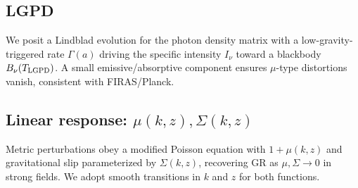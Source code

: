 
\subsection{LGPD}
We posit a Lindblad evolution for the photon density matrix with a low-gravity-triggered rate $\Gamma(a)$ driving the specific intensity $I_\nu$ toward a blackbody $B_\nu(T_{\rm LGPD})$. 
A small emissive/absorptive component ensures $\mu$-type distortions vanish, consistent with FIRAS/Planck.

\subsection{Linear response: $\mu(k,z), \Sigma(k,z)$}
Metric perturbations obey a modified Poisson equation with $1+\mu(k,z)$ and gravitational slip parameterized by $\Sigma(k,z)$, recovering GR as $\mu,\Sigma\to 0$ in strong fields. 
We adopt smooth transitions in $k$ and $z$ for both functions.
